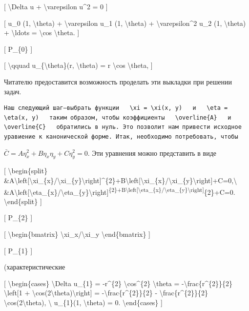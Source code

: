 \documentclass[
]{article}
\begin{document}
{[} \textbackslash Delta u + \textbackslash varepsilon u\^{}2 = 0 {]}

{[} u\_0 (1, \textbackslash theta) + \textbackslash varepsilon u\_1 (1,
\textbackslash theta) + \textbackslash varepsilon\^{}2 u\_2 (1,
\textbackslash theta) + \textbackslash ldots = \textbackslash cos
\textbackslash theta. {]}

{[} P\_\{0\} {]}

{[} \textbackslash qquad u\_\{\textbackslash theta\}(r,
\textbackslash theta) = r \textbackslash cos \textbackslash theta, {]}

Читателю предоставится возможность проделать эти выкладки при решении
задач.

\begin{verbatim}
Наш следующий шаг—выбрать функции   \xi = \xi(x, y)   и   \eta = \eta(x, y)   таким образом, чтобы коэффициенты   \overline{A}   и   \overline{C}   обратились в нуль. Это позволит нам привести исходное уравиение к канонической форме. Итак, необходимо потребовать, чтобы
\end{verbatim}

\(\bar{C} = A\eta_x^2 + B\eta_x\eta_y + C\eta_y^2 = 0.\) Эти уравнения
можно представить в виде

{[} \textbackslash begin\{split\}
\&A\textbackslash left{[}\textbackslash xi\_\{x\}/\textbackslash xi\_\{y\}\textbackslash right{]}\^{}\{2\}+B\textbackslash left{[}\textbackslash xi\_\{x\}/\textbackslash xi\_\{y\}\textbackslash right{]}+C=0,\textbackslash{}
\&A\textbackslash left{[}\textbackslash eta\_\{x\}/\textbackslash eta\_\{y\}\textbackslash right{]}\textsuperscript{\{2\}+B\textbackslash left{[}\textbackslash eta\_\{x\}/\textbackslash eta\_\{y\}\textbackslash right{]}}\{2\}+C=0.
\textbackslash end\{split\} {]}

{[} P\_\{2\} {]}

{[} \textbackslash begin\{bmatrix\}
\textbackslash xi\_x/\textbackslash xi\_y \textbackslash end\{bmatrix\}
{]}

{[} P\_\{1\} {]}

(характеристические

{[} \textbackslash begin\{cases\} \textbackslash Delta u\_\{1\} =
-r\^{}\{2\} \textbackslash cos\^{}\{2\} \textbackslash theta =
-\textbackslash frac\{r\^{}\{2\}\}\{2\} \textbackslash left{[}1 +
\textbackslash cos(2\textbackslash theta)\textbackslash right{]} =
-\textbackslash frac\{r\^{}\{2\}\}\{2\} -
\textbackslash frac\{r\^{}\{2\}\}\{2\}
\textbackslash cos(2\textbackslash theta), \textbackslash{} u\_\{1\}(1,
\textbackslash theta) = 0. \textbackslash end\{cases\} {]}
\end{document}
